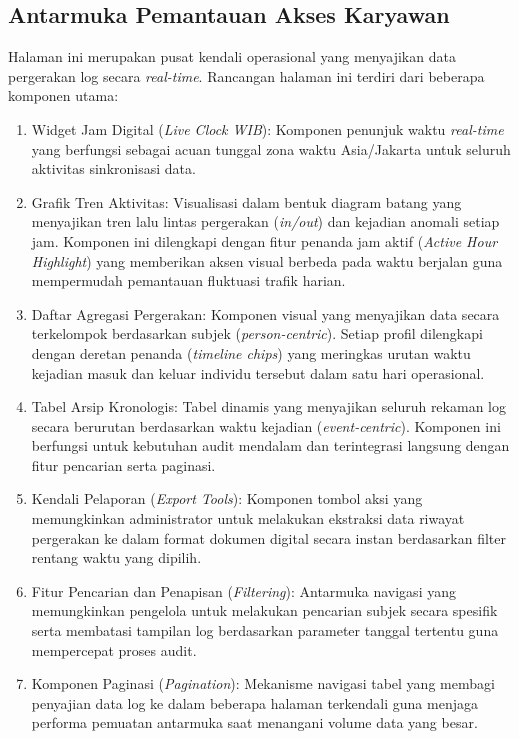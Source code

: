 \subsection{Antarmuka Pemantauan Akses Karyawan}
Halaman ini merupakan pusat kendali operasional yang menyajikan data pergerakan log secara \textit{real-time}. Rancangan halaman ini terdiri dari beberapa komponen utama:
\begin{enumerate}
    \item Widget Jam Digital (\textit{Live Clock WIB}): Komponen penunjuk waktu \textit{real-time} yang berfungsi sebagai acuan tunggal zona waktu Asia/Jakarta untuk seluruh aktivitas sinkronisasi data.
    \item Grafik Tren Aktivitas: Visualisasi dalam bentuk diagram batang yang menyajikan tren lalu lintas pergerakan (\textit{in/out}) dan kejadian anomali setiap jam. Komponen ini dilengkapi dengan fitur penanda jam aktif (\textit{Active Hour Highlight}) yang memberikan aksen visual berbeda pada waktu berjalan guna mempermudah pemantauan fluktuasi trafik harian.
    \item Daftar Agregasi Pergerakan: Komponen visual yang menyajikan data secara terkelompok berdasarkan subjek (\textit{person-centric}). Setiap profil dilengkapi dengan deretan penanda (\textit{timeline chips}) yang meringkas urutan waktu kejadian masuk dan keluar individu tersebut dalam satu hari operasional.
    \item Tabel Arsip Kronologis: Tabel dinamis yang menyajikan seluruh rekaman log secara berurutan berdasarkan waktu kejadian (\textit{event-centric}). Komponen ini berfungsi untuk kebutuhan audit mendalam dan terintegrasi langsung dengan fitur pencarian serta paginasi.
    \item Kendali Pelaporan (\textit{Export Tools}): Komponen tombol aksi yang memungkinkan administrator untuk melakukan ekstraksi data riwayat pergerakan ke dalam format dokumen digital secara instan berdasarkan filter rentang waktu yang dipilih.
    \item Fitur Pencarian dan Penapisan (\textit{Filtering}): Antarmuka navigasi yang memungkinkan pengelola untuk melakukan pencarian subjek secara spesifik serta membatasi tampilan log berdasarkan parameter tanggal tertentu guna mempercepat proses audit.
    \item Komponen Paginasi (\textit{Pagination}): Mekanisme navigasi tabel yang membagi penyajian data log ke dalam beberapa halaman terkendali guna menjaga performa pemuatan antarmuka saat menangani volume data yang besar.

\end{enumerate}
